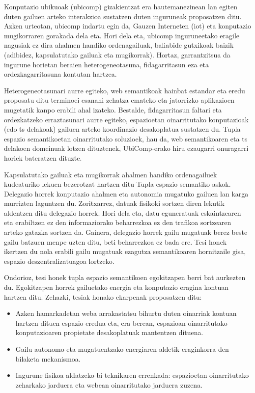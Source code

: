 \begin{laburpena}        %

Konputazio ubikuoak (\ac{ubicomp}) gizakientzat era hautemanezinean lan egiten duten gailuen arteko interakzioa sustatzen duten inguruneak proposatzen ditu.
Azken urteotan, \ac{ubicomp} indartu egin da, Gauzen Interneten (\ac{iot}) eta konputazio mugikorraren gorakada dela eta.
Hori dela eta, \ac{ubicomp} inguruneetako eragile nagusiak ez dira ahalmen handiko ordenagailuak, baliabide gutxikoak baizik (adibidez, kapsulatutako gailuak eta mugikorrak).
Hortaz, garrantzitsua da ingurune horietan beraien heterogeneotasuna, fidagarritasun eza eta ordezkagarritasuna kontutan hartzea.


Heterogeneotasunari aurre egiteko, web semantikoak hainbat estandar eta eredu proposatu ditu terminoei esanahi zehatza emateko eta jatorrizko aplikazioen mugetatik kanpo erabili ahal izateko.
Bestalde, fidagarritasun faltari eta ordezkatzeko erraztasunari aurre egiteko, espazioetan oinarritutako konputazioak (edo \acl{ts} delakoak) gailuen arteko koordinazio desakoplatua sustatzen du.
Tupla espazio semantikoetan oinarritutako soluzioek, hau da, web semantikoaren eta \acl{ts} delakoen domeinuak lotzen dituztenek, UbiComp-erako hiru ezaugarri onuragarri horiek bateratzen dituzte.


Kapsulatutako gailuak eta mugikorrak ahalmen handiko ordenagailuek kudeaturiko lekuen bezerotzat hartzen ditu Tupla espazio semantiko askok.
Delegazio horrek konputazio ahalmen eta autonomia  mugatuko gailuen lan karga murrizten laguntzen du.
Zoritxarrez, datuak fisikoki sortzen diren lekutik aldentzen ditu delegazio horrek.
Hori dela eta, datu eguneratuak eskaintzearen eta erabiltzen ez den informaziorako beharrezkoa ez den trafikoa sortzearen arteko gatazka sortzen da.
Gainera, delegazio horrek gailu mugatuak berez beste gailu batzuen menpe uzten ditu, beti beharrezkoa ez bada ere.
Tesi honek ikertzen du nola erabili gailu mugatuak ezagutza semantikoaren hornitzaile gisa, espazio deszentralizatuagoa lortzeko.


Ondorioz, tesi honek tupla espazio semantikoen egokitzapen  berri bat aurkezten du.
Egokitzapen horrek gailuetako energia eta konputazio eragina kontuan hartzen ditu.
Zehazki, tesiak honako ekarpenak proposatzen ditu:
\begin{itemize}
  \item Azken hamarkadetan weba arrakastatsu bihurtu duten oinarriak kontuan hartzen dituen espazio eredua eta, era berean, espazioan oinarritutako konputazioaren propietate desakoplatuak mantentzen dituena. 
  \item Gailu autonomo eta mugatuentzako energiaren aldetik eraginkorra den bilaketa mekanismoa.
  \item Ingurune fisikoa aldatzeko bi teknikaren errenkada: espazioetan oinarritutako zeharkako jarduera eta webean oinarritutako jarduera zuzena.
\end{itemize}

\end{laburpena}



